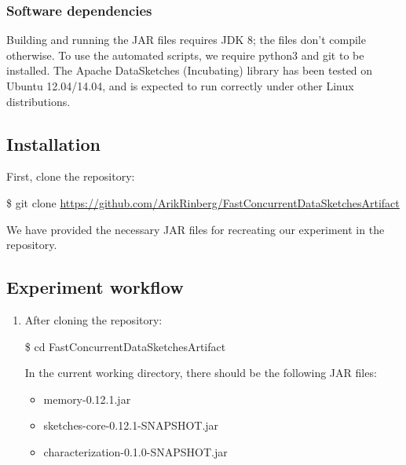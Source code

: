 {\subsubsection{Software dependencies}
Building and running the JAR files requires JDK 8; the files
don't compile otherwise. To use the automated scripts,
we require python3 and git to be installed. The Apache DataSketches (Incubating) library 
has been tested on Ubuntu 12.04/14.04, and is expected to run correctly under other Linux distributions.


\subsection{Installation}


First, clone the repository:

\begin{framed}

\$ git clone \url{https://github.com/ArikRinberg/FastConcurrentDataSketchesArtifact}

\end{framed}

\noindent We have provided the necessary JAR files for recreating our experiment in the repository.


\subsection{Experiment workflow}
\label{sec:workflow}

\begin{enumerate}
  \item After cloning the repository:

  \begin{framed}

  \$ cd FastConcurrentDataSketchesArtifact

  \end{framed}

  \noindent In the current working directory, there should be the following JAR files:

  \begin{itemize}
    \item memory-0.12.1.jar
    \item sketches-core-0.12.1-SNAPSHOT.jar
    \item characterization-0.1.0-SNAPSHOT.jar
  \end{itemize}



\end{enumerate}}
